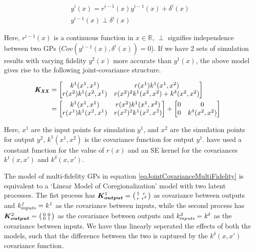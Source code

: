 \begin{align}
  & y^{i}(x) = r^{i-1}(x)y^{i-1}(x) + \delta^{i}(x) \\
  & y^{i-1}(x) \perp \delta^{i}(x)
\end{align}

Here, $r^{i-1}(x)$ is a continuous function in $x \in \mathbb{R}$, $\perp$ signifies independence between two GPs ($Cov(y^{i-1}(x), \delta^{i}(x)) = 0$). If we have 2 sets of simulation results with varying fidelity $y^{2}(x)$ more accurate than $y^{1}(x)$, the above model gives rise to the following joint-covariance structure.

\begin{equation}\label{eqJointCovarianceMultiFidelity}
         \begin{aligned}
           \bm{\mathit{K_{XX}}}   & = \begin{bmatrix} k^{1}(x^{1}, x^{1}) & r(x^{1})k^{1}(x^{1}, x^{2})   \\
           r(x^{2})k^{1}(x^{2}, x^{1}) & r(x^{2})^2k^{1}(x^{2}, x^{2}) + k^{\delta}(x^{2}, x^{2}) \end{bmatrix} \\ 
           & = \begin{bmatrix} k^{1}(x^{1}, x^{1}) & r(x^{2})k^{1}(x^{1}, x^{2})   \\ r(x^{1})k^{1}(x^{2}, x^{1}) & r(x^{2})^2k^{1}(x^{2}, x^{2}) \end{bmatrix} 
           +  
\begin{bmatrix} 0 & 0 \\ 0 & k^{\delta}(x^{2}, x^{2}) \end{bmatrix} 
         \end{aligned}
\end{equation}

Here, $x^{1}$ are the input points for simulation $y^{1}$, and $x^{2}$ are the simulation points for output $y^{2}$, $k^{1}(x^{1}, x^{2})$ is the covariance function for output $y^{1}$. \cite{kennedy2000predicting} have used a constant function for the value of $r(x)$ and an SE kernel for the covariances $k^{1}(x, x')$ and $k^{\delta}(x, x')$. 

The model of multi-fidelity GPs in equation \ref{eqJointCovarianceMultiFidelity} is equivalent to a `Linear Model of Coregionalization' model with two latent processes. The fist process has $\boldsymbol{K_{output}}^{1} = \bigl( \begin{smallmatrix} 1 & r\\ r & r^2\end{smallmatrix}\bigr)$ as covariance between outputs and $\mathit{k_{inputs}^1 = k^1}$ as the covariance between inputs, while the second process has $\boldsymbol{K_{output}}^{2} = \bigl( \begin{smallmatrix} 0 & 0\\ 0 & 1\end{smallmatrix}\bigr)$ as the covariance between outputs and $\mathit{k_{inputs}^2 = k^\delta}$ as the covariance between inputs. We have thus linearly seperated the effects of both the models, such that the difference between the two is captured by the $k^{\delta}(x, x')$ covariance function.

